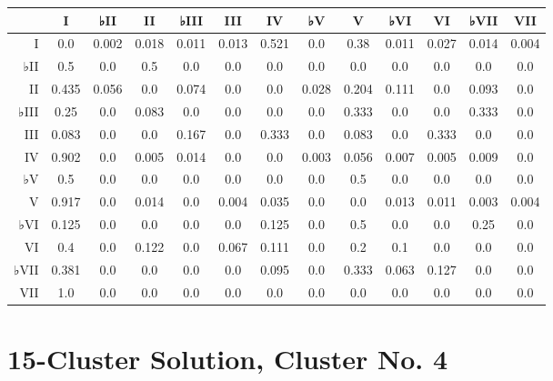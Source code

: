 \begin{table}[htbp]
\begin{minipage}{\linewidth}
\setlength{\tymax}{0.5\linewidth}
\centering
\small
\begin{tabulary}{\textwidth}{@{}RCCCCCCCCCCCC@{}} \toprule
&I&♭II&II&♭III&III&IV&♭V&V&♭VI&VI&♭VII&VII\\
\midrule
I&0.0&0.002&0.018&0.011&0.013&0.521&0.0&0.38&0.011&0.027&0.014&0.004\\
♭II&0.5&0.0&0.5&0.0&0.0&0.0&0.0&0.0&0.0&0.0&0.0&0.0\\
II&0.435&0.056&0.0&0.074&0.0&0.0&0.028&0.204&0.111&0.0&0.093&0.0\\
♭III&0.25&0.0&0.083&0.0&0.0&0.0&0.0&0.333&0.0&0.0&0.333&0.0\\
III&0.083&0.0&0.0&0.167&0.0&0.333&0.0&0.083&0.0&0.333&0.0&0.0\\
IV&0.902&0.0&0.005&0.014&0.0&0.0&0.003&0.056&0.007&0.005&0.009&0.0\\
♭V&0.5&0.0&0.0&0.0&0.0&0.0&0.0&0.5&0.0&0.0&0.0&0.0\\
V&0.917&0.0&0.014&0.0&0.004&0.035&0.0&0.0&0.013&0.011&0.003&0.004\\
♭VI&0.125&0.0&0.0&0.0&0.0&0.125&0.0&0.5&0.0&0.0&0.25&0.0\\
VI&0.4&0.0&0.122&0.0&0.067&0.111&0.0&0.2&0.1&0.0&0.0&0.0\\
♭VII&0.381&0.0&0.0&0.0&0.0&0.095&0.0&0.333&0.063&0.127&0.0&0.0\\
VII&1.0&0.0&0.0&0.0&0.0&0.0&0.0&0.0&0.0&0.0&0.0&0.0\\

\bottomrule

\end{tabulary}
\end{minipage}
\end{table}

\section{15-Cluster Solution, Cluster No. 4}
\label{15-clustersolutionclusterno.4}

